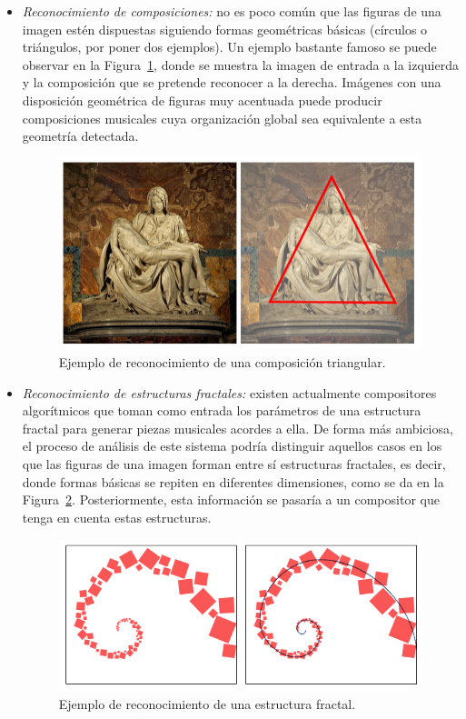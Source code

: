 \begin{itemize}
\begin{itemize}
		\item\textit{Reconocimiento de composiciones:} no es poco común que las figuras de una imagen estén dispuestas siguiendo formas geométricas básicas (círculos o triángulos, por poner dos ejemplos). Un ejemplo bastante famoso se puede observar en la Figura~\ref{fig:composition}, donde se muestra la imagen de entrada a la izquierda y la composición que se pretende reconocer a la derecha. Imágenes con una disposición geométrica de figuras muy acentuada puede producir composiciones musicales cuya organización global sea equivalente a esta geometría detectada.\\
			
			\begin{figure}[!htbp]
			\centering
			\includegraphics[scale=0.40]{graphics/composition2.png}
			\caption{Ejemplo de reconocimiento de una composición triangular.}
			\label{fig:composition}
			\end{figure}
		
		\item\textit{Reconocimiento de estructuras fractales:}
\color{blue}existen actualmente compositores algorítmicos que toman como entrada los parámetros de una estructura fractal para generar piezas musicales acordes a ella. De forma más ambiciosa, el proceso de análisis de este sistema podría distinguir aquellos casos en los que las figuras de una imagen forman entre sí estructuras fractales, es decir, donde formas básicas se repiten en diferentes dimensiones, como se da en la Figura~\ref{fig:fractal}. Posteriormente, esta información se pasaría a un compositor que tenga en cuenta estas estructuras.\color{black}
		
			\begin{figure}[!htbp]
			\centering
			\includegraphics[scale=0.47]{graphics/fractal.png}
			\caption{Ejemplo de reconocimiento de una estructura fractal.}
			\label{fig:fractal}
			\end{figure}


\end{itemize}
\end{itemize}
